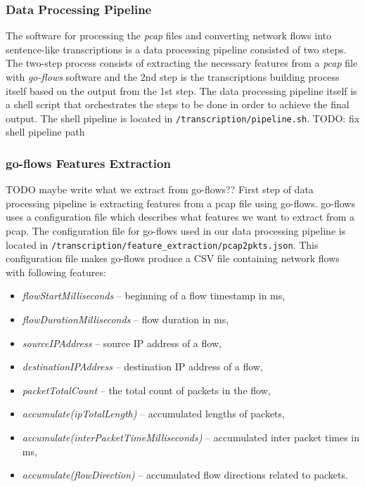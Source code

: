 \documentclass{article}
\begin{document}
\subsubsection{Data Processing Pipeline}
The software for processing the \textit{pcap} files and converting network flows into sentence-like transcriptions is a data processing pipeline consisted of two steps. The two-step process consists of extracting the necessary features from a \textit{pcap} file with \textit{go-flows} software \cite{goflows-reference} and the 2nd step is the transcriptions building process itself based on the output from the 1st step. The data processing pipeline itself is a shell script that orchestrates the steps to be done in order to achieve the final output. The shell pipeline is located in \verb|/transcription/pipeline.sh|.
TODO: fix shell pipeline path


\subsubsection{go-flows Features Extraction}
TODO maybe write what we extract from go-flows??
First step of data processing pipeline is extracting features from a pcap file using go-flows. go-flows uses a configuration file which describes what features we want to extract from a pcap. The configuration file for go-flows used in our data processing pipeline is located in \verb|/transcription/feature_extraction/pcap2pkts.json|. This configuration file makes go-flows produce a CSV file containing network flows with following features:

\begin{itemize}
    \item \textit{flowStartMilliseconds} -- beginning of a flow timestamp in ms,
    \item \textit{flowDurationMilliseconds} -- flow duration in ms,
    \item \textit{sourceIPAddress} -- source IP address of a flow,
    \item \textit{destinationIPAddress} -- destination IP address of a flow,
    \item \textit{packetTotalCount} -- the total count of packets in the flow,
    \item \textit{accumulate(ipTotalLength)} -- accumulated lengths of packets,
    \item \textit{accumulate(\textunderscore interPacketTimeMilliseconds)} -- accumulated inter packet times in ms,
    \item \textit{accumulate(flowDirection)} -- accumulated flow directions related to packets.
\end{itemize}
\end{document}
